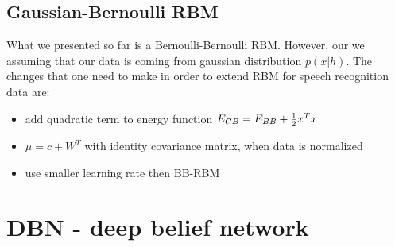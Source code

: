\subsection{Gaussian-Bernoulli RBM}
What we presented so far is a Bernoulli-Bernoulli RBM. However, our we assuming that our data is coming from gaussian distribution $p(x|h)$. The changes that one need to make in order to extend RBM for speech recognition data are:
\begin{itemize}
	\item add quadratic term to energy function $E_{GB} = E_{BB} + \frac{1}{2}x^Tx$
	\item $\mu=c + W^T$ with identity covariance matrix, when data is normalized
	\item use smaller learning rate then BB-RBM 
\end{itemize}



\section{DBN - deep belief network}
